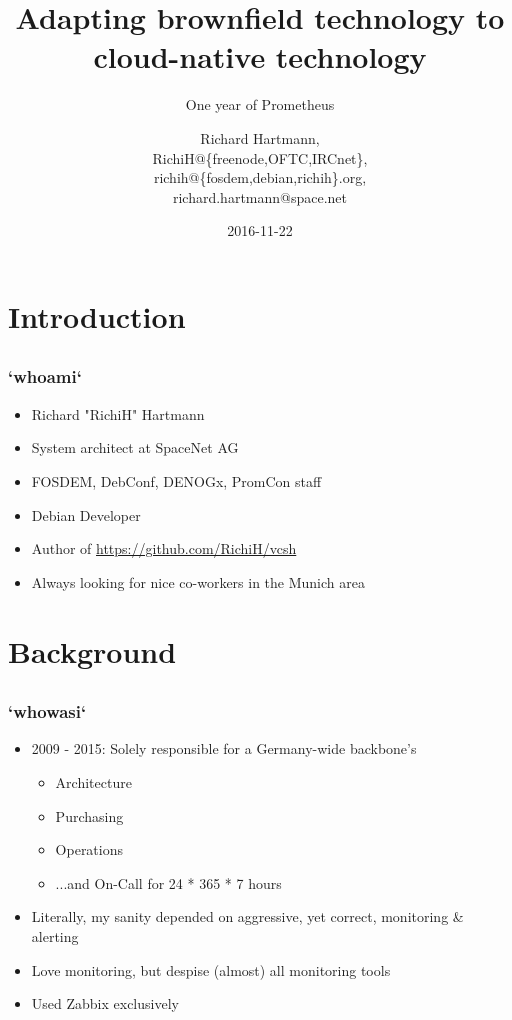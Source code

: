\documentclass[t]{beamer}
\title{Adapting brownfield technology to cloud-native technology}
\subtitle{One year of Prometheus}
\author{Richard Hartmann,\\
RichiH@\{freenode,OFTC,IRCnet\},\\
richih@\{fosdem,debian,richih\}.org,\\
richard.hartmann@space.net}
\date{2016-11-22}
\begin{document}
\setcounter{tocdepth}{1}

\begin{frame}
	\titlepage
\end{frame}


\section{Introduction}

\subsection{}

\begin{frame}
	\frametitle{`whoami`}
	\begin{itemize}
		\item Richard "RichiH" Hartmann
		\item System architect at SpaceNet AG
		\item FOSDEM, DebConf, DENOGx, PromCon staff
		\item Debian Developer
		\item Author of \url{https://github.com/RichiH/vcsh}
		\item Always looking for nice co-workers in the Munich area
	\end{itemize}
\end{frame}


\section{Background}

\subsection{}

\begin{frame}
	\frametitle{`whowasi`}
	\begin{itemize}
		\item 2009 - 2015: Solely responsible for a Germany-wide backbone's
		\begin{itemize}
			\item Architecture
			\item Purchasing
			\item Operations
			\item ...and On-Call for 24 * 365 * 7 hours
		\end{itemize}
		\item Literally, my sanity depended on aggressive, yet correct, monitoring \& alerting
		\item Love monitoring, but despise (almost) all monitoring tools
		\item Used Zabbix exclusively
	\end{itemize}
\end{frame}
\end{document}
